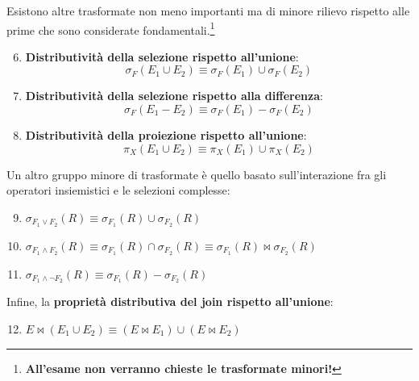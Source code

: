 \documentclass[a4paper]{article}
\begin{document}
	\noindent
	Esistono altre trasformate non meno importanti ma di minore rilievo rispetto alle prime che sono considerate fondamentali.\footnote{\textbf{All'esame non verranno chieste le trasformate minori!}}
	\begin{enumerate}[label=\Roman*.]
		\setcounter{enumi}{5}
		\item \textbf{Distributività della selezione rispetto all'unione}:
		\begin{equation*}
			\sigma_{F}\left(E_{1} \cup E_{2}\right) \equiv \sigma_{F}\left(E_{1}\right) \cup \sigma_{F}\left(E_{2}\right)
		\end{equation*}
		
		\item \textbf{Distributività della selezione rispetto alla differenza}:
		\begin{equation*}
			\sigma_{F}\left(E_{1} - E_{2}\right) \equiv \sigma_{F}\left(E_{1}\right) - \sigma_{F}\left(E_{2}\right)
		\end{equation*}
		
		\item \textbf{Distributività della proiezione rispetto all'unione}:
		\begin{equation*}
			\pi_{X}\left(E_{1} \cup E_{2}\right) \equiv \pi_{X}\left(E_{1}\right) \cup \pi_{X}\left(E_{2}\right)
		\end{equation*}
	\end{enumerate}\:\newline
	
	\noindent
	Un altro gruppo minore di trasformate è quello basato sull'interazione fra gli operatori insiemistici e le selezioni complesse:
	\begin{enumerate}[label=\Roman*.]
		\setcounter{enumi}{8}
		\item $%
		\sigma_{F_{1} \lor F_{2}}\left(R\right) \equiv \sigma_{F_{1}}\left(R\right) \cup \sigma_{F_{2}}\left(R\right)$
		
		\item $%
		\sigma_{F_{1} \land F_{2}}\left(R\right) \equiv \sigma_{F_{1}}\left(R\right) \cap \sigma_{F_{2}}\left(R\right) \equiv \sigma_{F_{1}}\left(R\right) \Join \sigma_{F_{2}}\left(R\right)$
		
		\item $%
		\sigma_{F_{1} \land \lnot F_{2}}\left(R\right) \equiv \sigma_{F_{1}}\left(R\right) - \sigma_{F_{2}}\left(R\right)$
	\end{enumerate}\:\newline
	
	\noindent
	Infine, la \textbf{proprietà distributiva del join rispetto all'unione}:
	\begin{enumerate}[label=\Roman*.]
		\setcounter{enumi}{11}
		\item $%
		E \Join\left( E_{1} \cup E_{2} \right) \equiv \left(E \Join E_{1}\right) \cup \left(E \Join E_{2}\right)$
	\end{enumerate}\newpage
	
\end{document}
